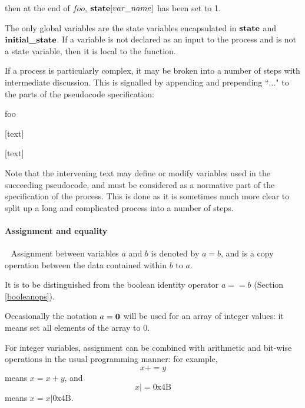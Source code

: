 then at the end of $foo$, $\textbf{state}[var\_name]$ has been set to 1.

The only global variables are the state variables encapsulated in $\textbf{state}$
and $\textbf{initial\_state}$. If a variable is not declared as an input to
the process and is not a state variable, then it is local to the function.

If a process is particularly complex, it may be broken into a number of steps with 
intermediate discussion. This is signalled by appending  and prepending ``$\hdots$" to
the parts of the pseudocode specification:

\begin{pseudo}{foo}{}
\bsCODE{\hdots}
\end{pseudo}

[text]

\begin{pseudo*}
\bsCODE{\hdots}
\end{pseudo*}

[text]

\begin{pseudo*}
\end{pseudo*}

Note that the intervening text may define or modify variables used in the succeeding
pseudocode, and must be considered as a normative part of the specification of the process.
This is done as it is sometimes much more clear to split up a long and complicated process
into a number of steps.


\paragraph{Assignment and equality}
$\ $\newline$\ $\newline
Assignment between variables $a$ and $b$ is denoted by $a=b$, and is a copy
operation between the data contained within $b$ to $a$. 

It is to be distinguished from
the boolean identity operator $a==b$ (Section \ref{booleanops}).

Occasionally the notation $a={\bf 0}$ will be used for an array of integer values:
it means set all elements of the array to 0.

For integer variables, assignment can be combined with arithmetic and bit-wise
operations in the usual programming manner: for example, 
\[x+=y\]
means $x=x+y$, and
\[x |= \text{0x4B}\]
means $x=x|\text{0x4B}$.

